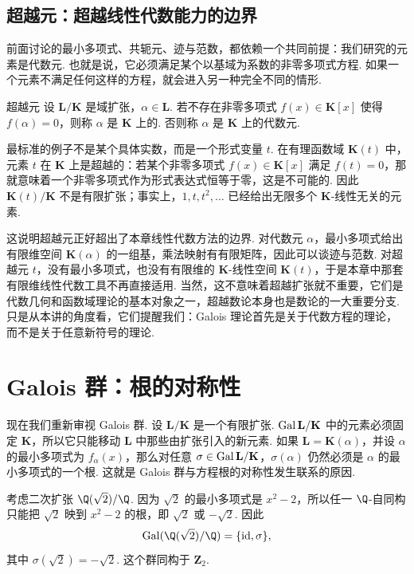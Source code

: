\subsection{超越元：超越线性代数能力的边界}

前面讨论的最小多项式、共轭元、迹与范数，都依赖一个共同前提：我们研究的元素是代数元. 也就是说，它必须满足某个以基域为系数的非零多项式方程. 如果一个元素不满足任何这样的方程，就会进入另一种完全不同的情形.

\begin{definition}{超越元}{}
    设 $\mathbf{L}/\mathbf{K}$ 是域扩张，$\alpha\in\mathbf{L}$. 若不存在非零多项式 $f(x)\in\mathbf{K}[x]$ 使得 $f(\alpha)=0$，则称 $\alpha$ 是 $\mathbf{K}$ 上的. 否则称 $\alpha$ 是 $\mathbf{K}$ 上的代数元.
\end{definition}

最标准的例子不是某个具体实数，而是一个形式变量 $t$. 在有理函数域 $\mathbf{K}(t)$ 中，元素 $t$ 在 $\mathbf{K}$ 上是超越的：若某个非零多项式 $f(x)\in\mathbf{K}[x]$ 满足 $f(t)=0$，那就意味着一个非零多项式作为形式表达式恒等于零，这是不可能的. 因此 $\mathbf{K}(t)/\mathbf{K}$ 不是有限扩张；事实上，$1,t,t^2,\ldots$ 已经给出无限多个 $\mathbf{K}$-线性无关的元素.

这说明超越元正好超出了本章线性代数方法的边界. 对代数元 $\alpha$，最小多项式给出有限维空间 $\mathbf{K}(\alpha)$ 的一组基，乘法映射有有限矩阵，因此可以谈迹与范数. 对超越元 $t$，没有最小多项式，也没有有限维的 $\mathbf{K}$-线性空间 $\mathbf{K}(t)$，于是本章中那套有限维线性代数工具不再直接适用. 当然，这不意味着超越扩张就不重要，它们是代数几何和函数域理论的基本对象之一，超越数论本身也是数论的一大重要分支. 只是从本讲的角度看，它们提醒我们：Galois 理论首先是关于代数方程的理论，而不是关于任意新符号的理论.

\section{Galois 群：根的对称性}

现在我们重新审视 Galois 群. 设 $\mathbf{L}/\mathbf{K}$ 是一个有限扩张. $\operatorname{Gal} \mathbf{L}/\mathbf{K}$ 中的元素必须固定 $\mathbf{K}$，所以它只能移动 $\mathbf{L}$ 中那些由扩张引入的新元素. 如果 $\mathbf{L}=\mathbf{K}(\alpha)$，并设 $\alpha$ 的最小多项式为 $f_\alpha(x)$，那么对任意 $\sigma\in\operatorname{Gal} \mathbf{L}/\mathbf{K}$，$\sigma(\alpha)$ 仍然必须是 $\alpha$ 的最小多项式的一个根. 这就是 Galois 群与方程根的对称性发生联系的原因.

\begin{example}{}{}
    考虑二次扩张 $\Q(\sqrt{2})/\Q$. 因为 $\sqrt{2}$ 的最小多项式是 $x^2-2$，所以任一 $\Q$-自同构只能把 $\sqrt{2}$ 映到 $x^2-2$ 的根，即 $\sqrt{2}$ 或 $-\sqrt{2}$. 因此
    \[
        \Gal(\Q(\sqrt{2})/\Q)=\{\operatorname{id},\sigma\},
    \]
    其中 $\sigma(\sqrt{2})=-\sqrt{2}$. 这个群同构于 $\mathbf{Z}_2$.
\end{example}

